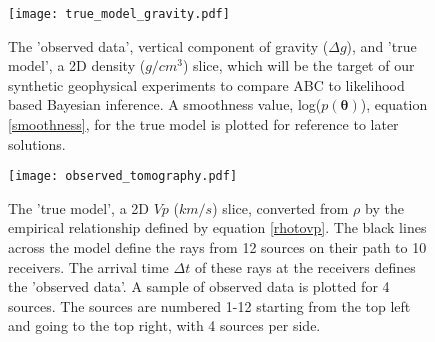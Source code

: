 \begin{figure}[H]
	\centering
	\texttt{[image: true\_model\_gravity.pdf]}
	\caption{The 'observed data', vertical component of gravity ($\Delta g$), and 'true model', a 2D density ($g/cm^3$) slice, which will be the target of our synthetic geophysical experiments to compare ABC to likelihood based Bayesian inference. A smoothness value, log($p(\bm{\theta})$), equation \ref{smoothness}, for the true model is plotted for reference to later solutions.}
	\label{true-model-large-grav}
\end{figure}

\begin{figure}[H]
	\centering
	\texttt{[image: observed\_tomography.pdf]}
	\caption{The 'true model', a 2D $Vp$ ($km/s$) slice, converted from $\rho$ by the empirical relationship defined by equation \ref{rhotovp}. The black lines across the model define the rays from 12 sources on their path to 10 receivers. The arrival time $\Delta t$ of these rays at the receivers defines the 'observed data'. A sample of observed data is plotted for 4 sources. The sources are numbered 1-12 starting from the top left and going to the top right, with 4 sources per side.}
	\label{true-model-tom}
\end{figure}


